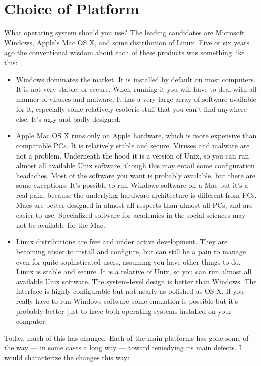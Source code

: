 \documentclass[11pt,article]{memoir}
\begin{document}
\chapter{Choice of Platform}

What operating system should you use? The leading candidates are Microsoft Windows, Apple's Mac OS X, and some distribution of Linux. Five or six years ago the conventional wisdom about each of these products was something like this:  
                                                                                      
\begin{itemize}
	\item Windows dominates the market. It is installed by default on most computers. It is not very stable, or secure. When running it you will have to deal with all manner of viruses and malware. It has a very large array of software available for it, especially some relatively esoteric stuff that you can't find anywhere else. It's ugly and badly designed. 
	\item Apple Mac OS X runs only on Apple hardware, which is more expensive than comparable PCs. It is relatively stable and secure. Viruses and malware are not a problem. Underneath the hood it is a version of Unix, so you can run almost all available Unix software, though this may entail some configuration headaches. Most of the software you want is probably available, but there are some exceptions. It's possible to run Windows software on a Mac but it's a real pain, because the underlying hardware architecture is different from PCs. Macs are better designed in almost all respects than almost all PCs, and are easier to use. Specialized software for academics in the social sciences may not be available for the Mac. 
	\item Linux distributions are free and under active development. They are becoming easier to install and configure, but can still be a pain to manage even for quite sophisticated users, assuming you have other things to do. Linux is stable and secure. It is a relative of Unix, so you can run almost all available Unix software. The system-level design is better than Windows. The interface is highly configurable but not nearly as polished as OS X. If you really have to run Windows software some emulation is possible but it's probably better just to have both operating systems installed on your computer. 
\end{itemize}

Today, much of this has changed. Each of the main platforms has gone some of the way --- in some cases a long way --- toward remedying its main defects. I would characterize the changes this way: 
\end{document}
